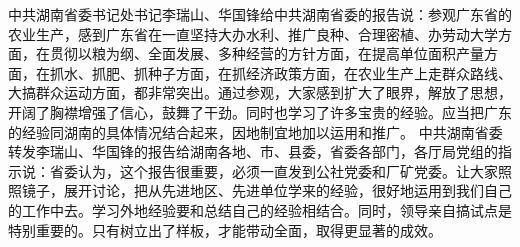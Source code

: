 \begin{maonote}
中共湖南省委书记处书记李瑞山、华国锋给中共湖南省委的报告说：参观广东省的农业生产，感到广东省在一直坚持大办水利、推广良种、合理密植、办劳动大学方面，在贯彻以粮为纲、全面发展、多种经营的方针方面，在提高单位面积产量方面，在抓水、抓肥、抓种子方面，在抓经济政策方面，在农业生产上走群众路线、大搞群众运动方面，都非常突出。通过参观，大家感到扩大了眼界，解放了思想，开阔了胸襟增强了信心，鼓舞了干劲。同时也学习了许多宝贵的经验。应当把广东的经验同湖南的具体情况结合起来，因地制宜地加以运用和推广。
中共湖南省委转发李瑞山、华国锋的报告给湖南各地、市、县委，省委各部门，各厅局党组的指示说：省委认为，这个报告很重要，必须一直发到公社党委和厂矿党委。让大家照照镜子，展开讨论，把从先进地区、先进单位学来的经验，很好地运用到我们自己的工作中去。学习外地经验要和总结自己的经验相结合。同时，领导亲自搞试点是特别重要的。只有树立出了样板，才能带动全面，取得更显著的成效。
\end{maonote}
